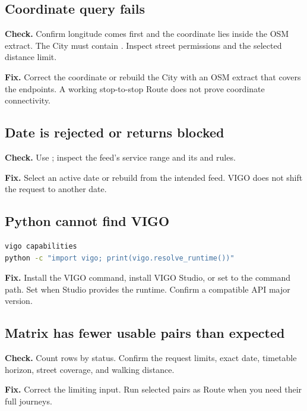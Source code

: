 \documentclass[10pt,letterpaper]{article}
\begin{document}
\subsection{Coordinate query fails}

\textbf{Check.} Confirm longitude comes first and the coordinate lies inside the OSM extract. The City must contain . Inspect street permissions and the selected distance limit.

\textbf{Fix.} Correct the coordinate or rebuild the City with an OSM extract that covers the endpoints. A working stop-to-stop Route does not prove coordinate connectivity.

\subsection{Date is rejected or returns blocked}

\textbf{Check.} Use ; inspect the feed's service range and its  and  rules.

\textbf{Fix.} Select an active date or rebuild from the intended feed. VIGO does not shift the request to another date.

\subsection{Python cannot find VIGO}

\begin{lstlisting}[language=bash]
vigo capabilities
python -c "import vigo; print(vigo.resolve_runtime())"
\end{lstlisting}

\textbf{Fix.} Install the VIGO command, install VIGO Studio, or set  to the command path. Set  when Studio provides the runtime. Confirm a compatible API major version.

\subsection{Matrix has fewer usable pairs than expected}

\textbf{Check.} Count rows by status. Confirm the request limits, exact date, timetable horizon, street coverage, and walking distance.

\textbf{Fix.} Correct the limiting input. Run selected pairs as Route when you need their full journeys.
\end{document}
